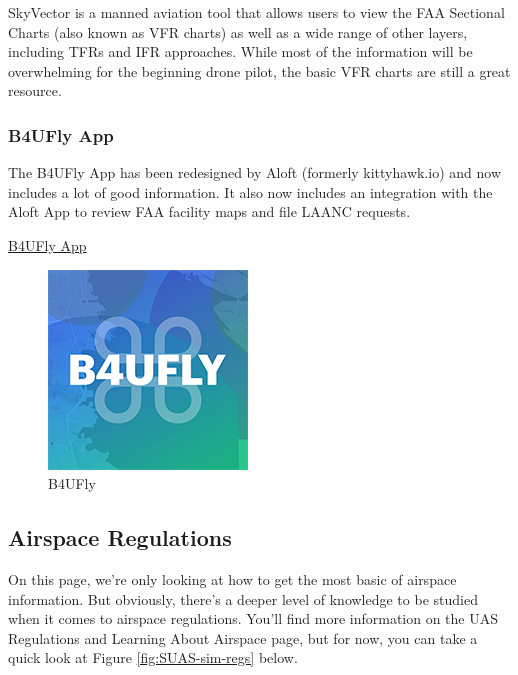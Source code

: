 \documentclass[
  12pt,
]{book}
\begin{document}
SkyVector is a manned aviation tool that allows users to view the FAA Sectional Charts (also known as VFR charts) as well as a wide range of other layers, including TFRs and IFR approaches. While most of the information will be overwhelming for the beginning drone pilot, the basic VFR charts are still a great resource.

\hypertarget{b4ufly-app}{%
\subsubsection{B4UFly App}\label{b4ufly-app}}

The B4UFly App has been redesigned by Aloft (formerly kittyhawk.io) and now includes a lot of good information. It also now includes an integration with the Aloft App to review FAA facility maps and file LAANC requests.

\href{https://www.faa.gov/uas/recreational_fliers/where_can_i_fly/b4ufly/}{B4UFly App}

\begin{figure}

{\centering \includegraphics[width=0.5\linewidth]{images/B4UFLYlogo} 

}

\caption{B4UFly}\label{fig:b4ufly}
\end{figure}

\hypertarget{airspace-regulations}{%
\subsection{Airspace Regulations}\label{airspace-regulations}}

On this page, we're only looking at how to get the most basic of airspace information. But obviously, there's a deeper level of knowledge to be studied when it comes to airspace regulations. You'll find more information on the UAS Regulations and Learning About Airspace page, but for now, you can take a quick look at Figure \ref{fig:SUAS-sim-regs} below.
\end{document}
